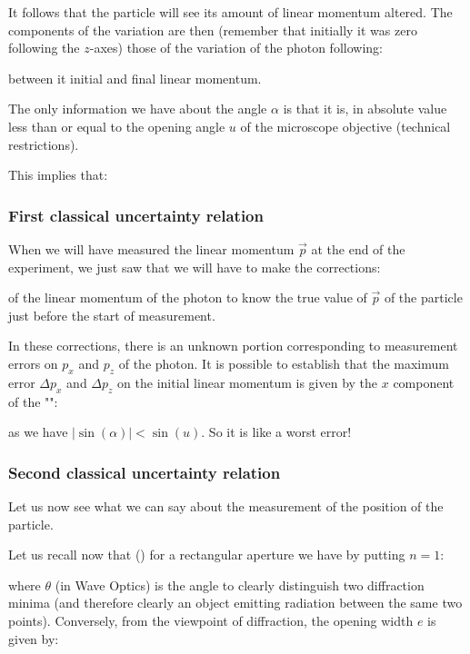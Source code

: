 	It follows that the particle will see its amount of linear momentum altered. The components of the variation are then (remember that initially it was zero following the $z$-axes) those of the variation of the photon following:
	
	between it initial and final linear momentum.

	The only information we have about the angle $\alpha$ is that it is, in absolute value less than or equal to the opening angle $u$ of the microscope objective (technical restrictions).

	This implies that:
	
	
	\subsubsection{First classical uncertainty relation}
	When we will have measured the linear momentum $\vec{p}$ at the end of the experiment, we just saw that we will have to make the corrections:
	
	of the linear momentum of the photon to know the true value of $\vec{p}$ of the particle just before the start of measurement.

	In these corrections, there is an unknown portion corresponding to measurement errors on $p_x$ and $p_z$ of the photon. It is possible to establish that the maximum error $\Delta p_x$ and $\Delta p_z$ on the initial linear momentum is given by the $x$ component of the "":
	
	as we have $|\sin(\alpha)|<\sin(u)$. So it is like a worst error!
	
	\subsubsection{Second classical uncertainty relation}
	Let us now see what we can say about the measurement of the position of the particle.

	Let us recall now that () for a rectangular aperture we have by putting $n=1$:
	
	where $\theta$ (in Wave Optics) is the angle to clearly distinguish two diffraction minima (and therefore clearly an object emitting radiation between the same two points). Conversely, from the viewpoint of diffraction, the opening width $e$ is given by:
	
